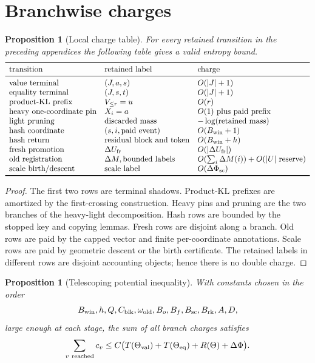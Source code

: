 \documentclass[11pt]{article}
\newtheorem{proposition}[theorem]{Proposition}
\theoremstyle{remark}
\newcommand{\old}{\mathrm{old}}
\newcommand{\fr}{\mathrm{fr}}
\newcommand{\scal}{\mathrm{sc}}
\newcommand{\rk}{\mathrm{rk}}
\begin{document}
\section{Branchwise charges}\label{app:charges}

\begin{proposition}[Local charge table]\label{prop:app-local-charge-table}
For every retained transition in the preceding appendices the following table gives a valid entropy bound.
\[
\begin{array}{lll}
\toprule
\hbox{transition} & \hbox{retained label} & \hbox{charge}\\
\midrule
\hbox{value terminal} & (J,a,s) & O(|J|+1)\\
\hbox{equality terminal} & (J,s,t) & O(|J|+1)\\
\hbox{product-KL prefix} & V_{\le r}=u & O(r)\\
\hbox{heavy one-coordinate pin} & X_i=a & O(1)\hbox{ plus paid prefix}\\
\hbox{light pruning} & \hbox{discarded mass} & -\log(\hbox{retained mass})\\
\hbox{hash coordinate} & (s,i,\hbox{paid event}) & O(B_{\rm win}+1)\\
\hbox{hash return} & \hbox{residual block and token} & O(B_{\rm win}+h)\\
\hbox{fresh promotion} & \Delta U_{\fr} & O(|\Delta U_{\fr}|)\\
\hbox{old registration} & \Delta M,\hbox{bounded labels} & O(\sum_i\Delta M(i))+O(|U|\hbox{ reserve})\\
\hbox{scale birth/descent} & \hbox{scale label} & O(\Delta\Phi_{\scal})\\
\bottomrule
\end{array}
\]
\end{proposition}

\begin{proof}
The first two rows are terminal shadows.  Product-KL prefixes are amortized by the first-crossing construction.  Heavy pins and pruning are the two branches of the heavy-light decomposition.  Hash rows are bounded by the stopped key and copying lemmas.  Fresh rows are disjoint along a branch.  Old rows are paid by the capped vector and finite per-coordinate annotations.  Scale rows are paid by geometric descent or the birth certificate.  The retained labels in different rows are disjoint accounting objects; hence there is no double charge.
\end{proof}

\begin{proposition}[Telescoping potential inequality]\label{prop:app-telescope}
With constants chosen in the order
\[
        B_{\rm win},h,Q,C_{\rm blk},\omega_{\old},B_o,B_f,B_{\scal},B_{\rk},A,D,
\]
large enough at each stage, the sum of all branch charges satisfies
\[
        \sum_{v\ {\rm reached}} c_v
        \le C\bigl(T(\Theta_{\rm val})+T(\Theta_{\rm eq})+R(\Theta)+\Delta\Phi\bigr).
\]
\end{proposition}
\end{document}
